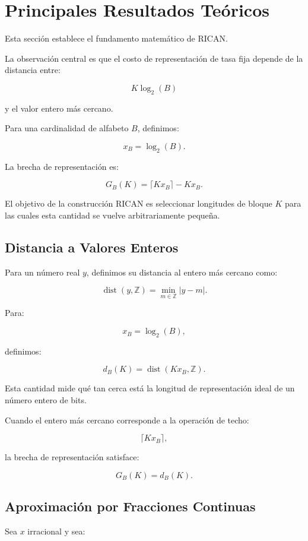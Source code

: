 \documentclass[onecolumn]{IEEEtran}
\begin{document}
\section{Principales Resultados Teóricos}

Esta sección establece el fundamento matemático de RICAN.

La observación central es que el costo de representación de tasa fija
depende de la distancia entre:

\[
K\log_2(B)
\]

y el valor entero más cercano.

Para una cardinalidad de alfabeto $B$, definimos:

\[
x_B=\log_2(B).
\]

La brecha de representación es:

\[
G_B(K)
=
\lceil Kx_B\rceil-Kx_B .
\]

El objetivo de la construcción RICAN es seleccionar longitudes de
bloque $K$ para las cuales esta cantidad se vuelve arbitrariamente
pequeña.

\subsection{Distancia a Valores Enteros}

Para un número real $y$, definimos su distancia al entero más cercano
como:

\[
\operatorname{dist}(y,\mathbb{Z})
=
\min_{m\in\mathbb{Z}}|y-m|.
\]

Para:

\[
x_B=\log_2(B),
\]

definimos:

\[
d_B(K)
=
\operatorname{dist}(Kx_B,\mathbb{Z}).
\]

Esta cantidad mide qué tan cerca está la longitud de representación
ideal de un número entero de bits.

Cuando el entero más cercano corresponde a la operación de techo:

\[
\lceil Kx_B\rceil,
\]

la brecha de representación satisface:

\[
G_B(K)=d_B(K).
\]

\subsection{Aproximación por Fracciones Continuas}

Sea $x$ irracional y sea:
\end{document}
